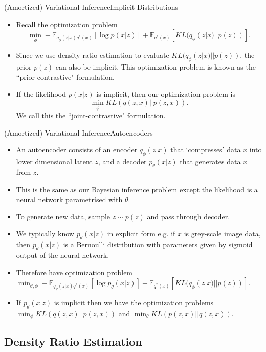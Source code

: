 \documentclass{beamer}
\begin{document}
\begin{frame}{(Amortized) Variational Inference}{Implicit Distributions}
\begin{itemize}
\item Recall the optimization problem \[\min_\phi -\mathbb{E}_{q_\phi(z|x)q^*(x)}[\log p(x|z)]+\mathbb{E}_{q^*(x)}[KL(q_\phi(z|x)||p(z))].\]
\item Since we use density ratio estimation to evaluate $KL(q_\phi(z|x)||p(z))$, the prior $p(z)$ can also be implicit. This optimization problem is known as the ``prior-contrastive" formulation.
\item If the likelihood $p(x|z)$ is implicit, then our optimization problem is \[\min_\phi KL(q(z,x)||p(z,x)).\] We call this the ``joint-contrastive" formulation.
\end{itemize}
\end{frame}
\begin{frame}{(Amortized) Variational Inference}{Autoencoders}
\begin{itemize}
\item An autoencoder consists of an encoder $q_\phi(z|x)$ that `compresses' data $x$ into lower dimensional latent $z$, and a decoder $p_\theta(x|z)$ that generates data $x$ from $z$.
\item This is the same as our Bayesian inference problem except the likelihood is a neural network parametrised with $\theta$.
\item To generate new data, sample $z\sim p(z)$ and pass through decoder.
\item We typically know $p_\theta(x|z)$ in explicit form e.g. if $x$ is grey-scale image data, then $p_\theta(x|z)$ is a Bernoulli distribution with parameters given by sigmoid output of the neural network.
\item Therefore have optimization problem $\min_{\theta, \phi} -\mathbb{E}_{q_\phi(z|x)q^*(x)}[\log p_\theta(x|z)]+\mathbb{E}_{q^*(x)}[KL(q_\phi(z|x)||p(z))].$
\item If $p_\theta(x|z)$ is implicit then we have the optimization problems $\min_\phi KL(q(z,x)||p(z,x))$ and $\min_\theta KL(p(z,x)||q(z,x))$.
\end{itemize}
\end{frame}
\subsection{Density Ratio Estimation}
\end{document}
